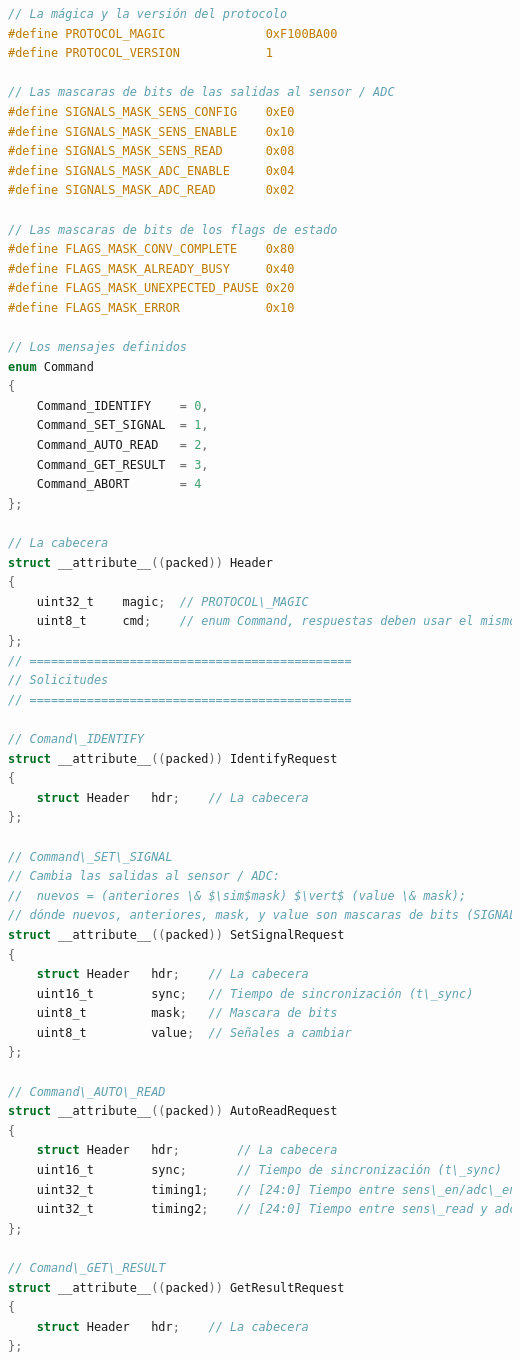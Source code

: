 \documentclass[a4paper, twoside, 11pt]{report}
\begin{document}
\begin{lstlisting}[language=C, style=CStyle, texcl=true]
// La mágica y la versión del protocolo
#define PROTOCOL_MAGIC              0xF100BA00
#define PROTOCOL_VERSION            1

// Las mascaras de bits de las salidas al sensor / ADC
#define SIGNALS_MASK_SENS_CONFIG    0xE0
#define SIGNALS_MASK_SENS_ENABLE    0x10
#define SIGNALS_MASK_SENS_READ      0x08
#define SIGNALS_MASK_ADC_ENABLE     0x04
#define SIGNALS_MASK_ADC_READ       0x02

// Las mascaras de bits de los flags de estado
#define FLAGS_MASK_CONV_COMPLETE    0x80
#define FLAGS_MASK_ALREADY_BUSY     0x40
#define FLAGS_MASK_UNEXPECTED_PAUSE 0x20
#define FLAGS_MASK_ERROR            0x10

// Los mensajes definidos
enum Command
{
    Command_IDENTIFY    = 0,
    Command_SET_SIGNAL  = 1,
    Command_AUTO_READ   = 2,
    Command_GET_RESULT  = 3,
    Command_ABORT       = 4
};

// La cabecera
struct __attribute__((packed)) Header
{
    uint32_t    magic;  // PROTOCOL\_MAGIC
    uint8_t     cmd;    // enum Command, respuestas deben usar el mismo que el solicitud
};
// =============================================
// Solicitudes
// =============================================

// Comand\_IDENTIFY
struct __attribute__((packed)) IdentifyRequest
{
    struct Header   hdr;    // La cabecera
};

// Command\_SET\_SIGNAL
// Cambia las salidas al sensor / ADC:
//  nuevos = (anteriores \& $\sim$mask) $\vert$ (value \& mask);
// dónde nuevos, anteriores, mask, y value son mascaras de bits (SIGNALS\_MASK\_...)
struct __attribute__((packed)) SetSignalRequest
{
    struct Header   hdr;    // La cabecera
    uint16_t        sync;   // Tiempo de sincronización (t\_sync)
    uint8_t         mask;   // Mascara de bits
    uint8_t         value;  // Señales a cambiar
};

// Command\_AUTO\_READ
struct __attribute__((packed)) AutoReadRequest
{
    struct Header   hdr;        // La cabecera
    uint16_t        sync;       // Tiempo de sincronización (t\_sync)
    uint32_t        timing1;    // [24:0] Tiempo entre sens\_en/adc\_en y sens\_read
    uint32_t        timing2;    // [24:0] Tiempo entre sens\_read y adc\_read
};

// Comand\_GET\_RESULT
struct __attribute__((packed)) GetResultRequest
{
    struct Header   hdr;    // La cabecera
};


\end{lstlisting}
\end{document}
